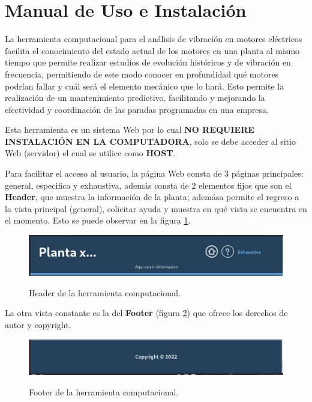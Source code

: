 \documentclass[12pt]{article}
\begin{document}
\section{Manual de Uso e Instalación}

La herramienta computacional para el análisis de vibración en motores eléctricos
facilita el conocimiento del estado actual de los motores en una planta al mismo
tiempo que permite realizar estudios de evolución históricos y de vibración en
frecuencia, permitiendo de este modo conocer en profundidad qué motores podrían
fallar y cuál será el elemento mecánico que lo hará. Esto permite la realización
de un mantenimiento predictivo, facilitando y mejorando la efectividad y
coordinación de las paradas programadas en una empresa.

Esta herramienta es un sistema Web por lo cual \textbf{NO REQUIERE INSTALACIÓN
EN LA COMPUTADORA}, solo se debe acceder al sitio Web (servidor) el cual se
utilice como \textbf{HOST}.

Para facilitar el acceso al usuario, la página Web consta de 3 páginas principales:
general, especifica y exhaustiva, además consta de 2 elementos fijos que son el
\textbf{Header}, que muestra la información de la planta;  ademása permite
el regreso a la vista principal (general),  solicitar ayuda y muestra en qué
vista se encuentra en el momento. Esto se puede observar en la figura
\ref{img:HeaderHerramienta}.

    \begin{figure}[H]
		\centering
        \caption{Header de la herramienta computacional. }
        \includegraphics[width=\linewidth]{ManualUsuario/header.png}
        \label{img:HeaderHerramienta}
	\end{figure}

La otra vista constante es la del \textbf{Footer} (figura
\ref{img:FooterHerramienta}) que ofrece los derechos de autor
y copyright.

    \begin{figure}[H]
		\centering
        \caption{Footer de la herramienta computacional. }
        \includegraphics[width=\linewidth]{ManualUsuario/footer.png}
        \label{img:FooterHerramienta}
	\end{figure}
\end{document}
